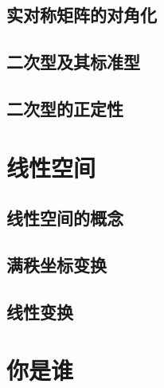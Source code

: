 \documentclass[lang=cn,10pt]{elegantbook}
\begin{document}
	\section{实对称矩阵的对角化}
	
	\section{二次型及其标准型}
	
	\section{二次型的正定性}

\chapter{线性空间}

	\section{线性空间的概念}
	
	\section{满秩坐标变换}
	
	\section{线性变换}

\chapter{你是谁}

\appendix
\end{document}

